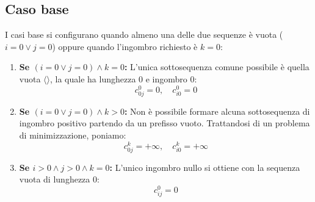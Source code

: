 \subsection{Caso base}
I casi base si configurano quando almeno una delle due sequenze è vuota ($i = 0 \lor j = 0$) oppure quando l'ingombro richiesto è $k = 0$:
\begin{enumerate}
    \item \textbf{Se $(i = 0 \lor j = 0) \land k = 0$:} L'unica sottosequenza comune possibile è quella vuota $\langle \rangle$, la quale ha lunghezza $0$ e ingombro $0$:
    \begin{equation*}
        c_{0j}^0 = 0, \quad c_{i0}^0 = 0
    \end{equation*}
    \item \textbf{Se $(i = 0 \lor j = 0) \land k > 0$:} Non è possibile formare alcuna sottosequenza di ingombro positivo partendo da un prefisso vuoto. Trattandosi di un problema di minimizzazione, poniamo:
    \begin{equation*}
        c_{0j}^k = +\infty, \quad c_{i0}^k = +\infty
    \end{equation*}
    \item \textbf{Se $i > 0 \land j > 0 \land k = 0$:} L'unico ingombro nullo si ottiene con la sequenza vuota di lunghezza $0$:
    \begin{equation*}
        c_{ij}^0 = 0
    \end{equation*}
\end{enumerate}

